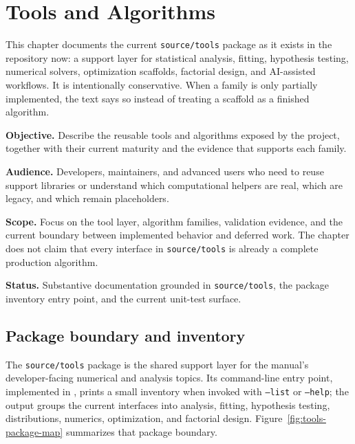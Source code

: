 \chapter{Tools and Algorithms}
\label{chap:tools-and-algorithms}

This chapter documents the current \texttt{source/tools} package as it exists in the repository now: a support layer for statistical analysis, fitting, hypothesis testing, numerical solvers, optimization scaffolds, factorial design, and AI-assisted workflows. It is intentionally conservative. When a family is only partially implemented, the text says so instead of treating a scaffold as a finished algorithm.

\noindent\textbf{Objective.} Describe the reusable tools and algorithms exposed by the project, together with their current maturity and the evidence that supports each family.

\noindent\textbf{Audience.} Developers, maintainers, and advanced users who need to reuse support libraries or understand which computational helpers are real, which are legacy, and which remain placeholders.

\noindent\textbf{Scope.} Focus on the tool layer, algorithm families, validation evidence, and the current boundary between implemented behavior and deferred work. The chapter does not claim that every interface in \texttt{source/tools} is already a complete production algorithm.

\noindent\textbf{Status.} Substantive documentation grounded in \texttt{source/tools}, the package inventory entry point, and the current unit-test surface.

\section{Package boundary and inventory}
\label{sec:tools-package-boundary}

The \texttt{source/tools} package is the shared support layer for the manual's developer-facing numerical and analysis topics. Its command-line entry point, implemented in , prints a small inventory when invoked with \texttt{--list} or \texttt{--help}; the output groups the current interfaces into analysis, fitting, hypothesis testing, distributions, numerics, optimization, and factorial design. Figure~\ref{fig:tools-package-map} summarizes that package boundary.

